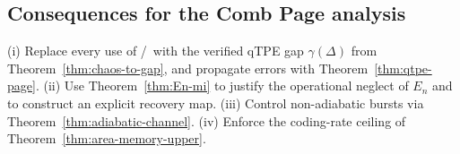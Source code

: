 \subsection{Consequences for the Comb Page analysis}\label{app:comb-consequences}
(i) Replace every use of \Ptwo/\PtwoPrime\ with the verified qTPE gap $\gamma(\Delta)$ from Theorem~\ref{thm:chaos-to-gap}, and propagate errors with Theorem~\ref{thm:qtpe-page}. (ii) Use Theorem~\ref{thm:En-mi} to justify the operational neglect of $E_n$ and to construct an explicit recovery map. (iii) Control non-adiabatic bursts via Theorem~\ref{thm:adiabatic-channel}. (iv) Enforce the coding-rate ceiling of Theorem~\ref{thm:area-memory-upper}.

